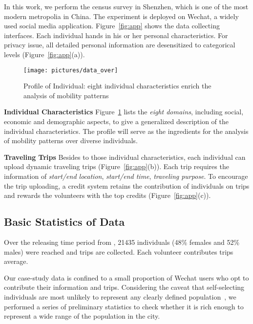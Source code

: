 In this work, we perform the census survey in Shenzhen, which is one of the most modern metropolia in China. The experiment is deployed on Wechat, a widely used social media application. Figure~\ref{fig:app} shows the data collecting interfaces. Each individual hands in his or her personal characteristics. For privacy issue, all detailed personal information are desensitized to categorical levels (Figure~\ref{fig:app}(a)).

\begin{figure}[htb!]
 \centering %
 \texttt{[image: pictures/data\_over]}
 \caption{Profile of Individual: eight individual characteristics enrich the analysis of mobility patterns}
 \label{fig:data_over}
\end{figure}


\textbf{Individual Characteristics} Figure~\ref{fig:data_over} lists the \textit{eight domains}, including social, economic and demographic aspects, to give a generalized description of the individual characteristics. The profile will serve as the ingredients for the analysis of mobility patterns over diverse individuals.

\textbf{Traveling Trips} Besides to those individual characteristics, each individual can upload dynamic traveling trips (Figure~\ref{fig:app}(b)). Each trip requires the information of \textit{start/end location}, \textit{start/end time}, \textit{traveling purpose}. To encourage the trip uploading, a credit system retains the contribution of individuals on trips and rewards the volunteers with the top credits (Figure~\ref{fig:app}(c)).


\subsection{Basic Statistics of Data}

Over the releasing time period from , 21435 individuals (48\% females and 52\% males) were reached and  trips are collected. Each volunteer contributes  trips average.

Our case-study data is confined to a small proportion of Wechat users who opt to contribute their information and trips.
Considering the caveat that self-selecting individuals are most unlikely to represent any clearly defined population~\citep{Longley2015}, we performed a series of preliminary statistics to check whether it is rich enough to represent a wide range of the population in the city.

